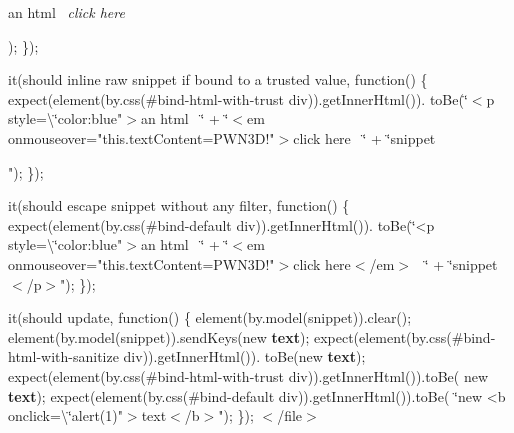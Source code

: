 an html~\newline
{\itshape click here}

\textquotesingle{}); \});

it(\textquotesingle{}should inline raw snippet if bound to a trusted value\textquotesingle{}, function() \{ expect(element(by.\+css(\textquotesingle{}\#bind-\/html-\/with-\/trust div\textquotesingle{})).get\+Inner\+Html()). to\+Be(\char`\"{}$<$p style=\textbackslash{}\char`\"{}color\+:blue"$>$an html~\newline
\char`\"{} +
              \char`\"{}$<$em onmouseover="this.\+text\+Content=\textquotesingle{}P\+W\+N3\+D!\textquotesingle{}"$>$click here~\newline
\char`\"{} +
              \char`\"{}snippet

"); \});

it(\textquotesingle{}should escape snippet without any filter\textquotesingle{}, function() \{ expect(element(by.\+css(\textquotesingle{}\#bind-\/default div\textquotesingle{})).get\+Inner\+Html()). to\+Be(\char`\"{}<p style=\textbackslash{}\char`\"{}color\+:blue"$>$an html~\newline
\char`\"{} +
              \char`\"{}$<$em onmouseover="this.\+text\+Content=\textquotesingle{}P\+W\+N3\+D!\textquotesingle{}"$>$click here$<$/em$>$~\newline
\char`\"{} +
              \char`\"{}snippet$<$/p$>$"); \});

it(\textquotesingle{}should update\textquotesingle{}, function() \{ element(by.\+model(\textquotesingle{}snippet\textquotesingle{})).clear(); element(by.\+model(\textquotesingle{}snippet\textquotesingle{})).send\+Keys(\textquotesingle{}new {\bfseries text}\textquotesingle{}); expect(element(by.\+css(\textquotesingle{}\#bind-\/html-\/with-\/sanitize div\textquotesingle{})).get\+Inner\+Html()). to\+Be(\textquotesingle{}new {\bfseries text}\textquotesingle{}); expect(element(by.\+css(\textquotesingle{}\#bind-\/html-\/with-\/trust div\textquotesingle{})).get\+Inner\+Html()).to\+Be( \textquotesingle{}new {\bfseries text}\textquotesingle{}); expect(element(by.\+css(\textquotesingle{}\#bind-\/default div\textquotesingle{})).get\+Inner\+Html()).to\+Be( \char`\"{}new <b onclick=\textbackslash{}\char`\"{}alert(1)"$>$text$<$/b$>$"); \}); $<$/file$>$ 


